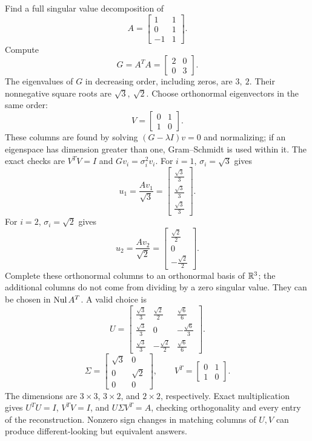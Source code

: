 \goal Find a full singular value decomposition of
\[A=\begin{bmatrix}1&1\\0&1\\-1&1\end{bmatrix}.\]
Compute
\[G=A^TA=\begin{bmatrix}2&0\\0&3\end{bmatrix}.\]
The eigenvalues of $G$ in decreasing order, including zeros, are $3,\ 2$. Their nonnegative square roots are $\sqrt{3},\ \sqrt{2}$. Choose orthonormal eigenvectors in the same order:
\[V=\begin{bmatrix}0&1\\1&0\end{bmatrix}.\]
These columns are found by solving $(G-\lambda I)v=0$ and normalizing; if an eigenspace has dimension greater than one, Gram--Schmidt is used within it. The exact checks are $V^TV=I$ and $Gv_i=\sigma_i^2v_i$.
For $i=1$, $\sigma_i=\sqrt{3}$ gives
\[u_{1}=\frac{Av_{1}}{\sqrt{3}}=\begin{bmatrix}\frac{\sqrt{3}}{3}\\\frac{\sqrt{3}}{3}\\\frac{\sqrt{3}}{3}\end{bmatrix}.\]
For $i=2$, $\sigma_i=\sqrt{2}$ gives
\[u_{2}=\frac{Av_{2}}{\sqrt{2}}=\begin{bmatrix}\frac{\sqrt{2}}{2}\\0\\- \frac{\sqrt{2}}{2}\end{bmatrix}.\]
Complete these orthonormal columns to an orthonormal basis of $\mathbb{R}^{3}$; the additional columns do not come from dividing by a zero singular value. They can be chosen in $\operatorname{Nul} A^T$.
A valid choice is
\[U=\begin{bmatrix}\frac{\sqrt{3}}{3}&\frac{\sqrt{2}}{2}&\frac{\sqrt{6}}{6}\\\frac{\sqrt{3}}{3}&0&- \frac{\sqrt{6}}{3}\\\frac{\sqrt{3}}{3}&- \frac{\sqrt{2}}{2}&\frac{\sqrt{6}}{6}\end{bmatrix}.\]
\[\Sigma=\begin{bmatrix}\sqrt{3}&0\\0&\sqrt{2}\\0&0\end{bmatrix},\qquad V^T=\begin{bmatrix}0&1\\1&0\end{bmatrix}.\]
The dimensions are $3\times3$, $3\times2$, and $2\times2$, respectively. Exact multiplication gives $U^TU=I$, $V^TV=I$, and $U\Sigma V^T=A$, checking orthogonality and every entry of the reconstruction. Nonzero sign changes in matching columns of $U,V$ can produce different-looking but equivalent answers.


